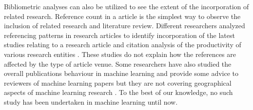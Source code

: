 Bibliometric analyses can also be utilized to see the extent of the incorporation of related research. Reference count in a article is the simplest way to observe the inclusion of related research and literature review. Different researchers analyzed referencing patterns in research articles to identify incorporation of the latest studies relating to a research article \citep{heilig2014scientometric} and citation analysis of the productivity of various research entities \citep{hamadicharef2012scientometric,bartneck2009scientometric}. These studies do not explain how the references are affected by the type of article venue. Some researchers have also studied the overall publications behaviour in machine learning and provide some advice to reviewers of machine learning  papers but they are not covering geographical aspects of machine learning research \citep{lipton2018troubling}. To the best of our knowledge, no such study has been undertaken in machine learning until now.
